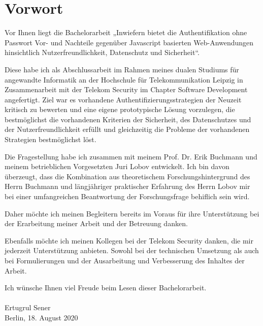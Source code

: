 \chapter{Vorwort}
Vor Ihnen liegt die Bachelorarbeit „Inwiefern bietet die Authentifikation ohne Passwort Vor- und Nachteile gegenüber Javascript basierten Web-Anwendungen hinsichtlich Nutzerfreundlichkeit, Datenschutz und Sicherheit“.

Diese habe ich als Abschlussarbeit im Rahmen meines dualen Studiums für angewandte Informatik an der Hochschule für Telekommunikation Leipzig in Zusammenarbeit mit der Telekom Security im Chapter Software Development angefertigt. Ziel war es vorhandene Authentifizierungsstrategien der Neuzeit kritisch zu bewerten und eine eigene prototypische Lösung vorzulegen, die bestmöglichst die vorhandenen Kriterien der Sicherheit, des Datenschutzes und der Nutzerfreundlichkeit erfüllt und gleichzeitig die Probleme der vorhandenen Strategien bestmöglichst löst.

Die Fragestellung habe ich zusammen mit meinem Prof. Dr. Erik Buchmann und meinem betrieblichen Vorgesetzten Juri Lobov entwickelt. Ich bin davon überzeugt, dass die Kombination aus theoretischem Forschungshintergrund des Herrn Buchmann und längjähriger praktischer Erfahrung des Herrn Lobov mir bei einer umfangreichen Beantwortung der Forschungsfrage behiflich sein wird.

Daher möchte ich meinen Begleitern bereits im Voraus für ihre Unterstützung bei der Erarbeitung meiner Arbeit und der Betreuung danken.

Ebenfalls möchte ich meinen Kollegen bei der Telekom Security danken, die mir jederzeit Unterstützung anbieten. Sowohl bei der technischen Umsetzung als auch bei Formulierungen und der Ausarbeitung und Verbesserung des Inhaltes der Arbeit.

Ich wünsche Ihnen viel Freude beim Lesen dieser Bachelorarbeit.\\
\\
Ertugrul Sener\\
Berlin, 18. August 2020
